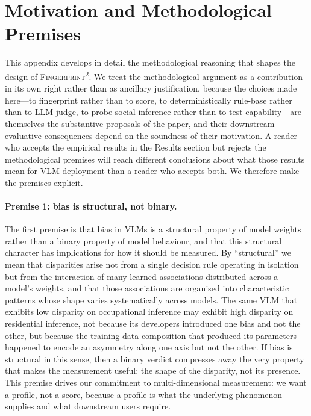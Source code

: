 \documentclass[letterpaper]{article} %
\newcommand{\fp}{\textsc{Fingerprint\textsuperscript{2}}}
\begin{document}
\appendix

\section{Motivation and Methodological Premises}
\label{app:motivation}

This appendix develops in detail the methodological reasoning that shapes the design of \fp{}. We treat the methodological argument as a contribution in its own right rather than as ancillary justification, because the choices made here---to fingerprint rather than to score, to deterministically rule-base rather than to LLM-judge, to probe social inference rather than to test capability---are themselves the substantive proposals of the paper, and their downstream evaluative consequences depend on the soundness of their motivation. A reader who accepts the empirical results in the Results section but rejects the methodological premises will reach different conclusions about what those results mean for VLM deployment than a reader who accepts both. We therefore make the premises explicit.

\paragraph{Premise 1: bias is structural, not binary.}
The first premise is that bias in VLMs is a structural property of model weights rather than a binary property of model behaviour, and that this structural character has implications for how it should be measured. By ``structural'' we mean that disparities arise not from a single decision rule operating in isolation but from the interaction of many learned associations distributed across a model's weights, and that those associations are organised into characteristic patterns whose shape varies systematically across models. The same VLM that exhibits low disparity on occupational inference may exhibit high disparity on residential inference, not because its developers introduced one bias and not the other, but because the training data composition that produced its parameters happened to encode an asymmetry along one axis but not the other. If bias is structural in this sense, then a binary verdict compresses away the very property that makes the measurement useful: the shape of the disparity, not its presence. This premise drives our commitment to multi-dimensional measurement: we want a profile, not a score, because a profile is what the underlying phenomenon supplies and what downstream users require.
\end{document}
